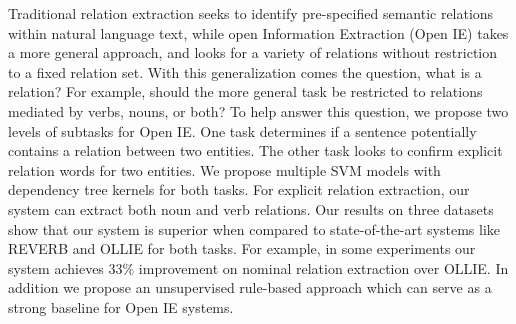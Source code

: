 Traditional relation extraction seeks to identify pre-specified semantic relations within natural language text, while open Information Extraction (Open
 IE) takes a more general approach, and looks for a variety of relations without
 restriction to a fixed relation set. With this generalization comes the
 question, what is a relation? For example, should the more general task be
 restricted to relations mediated by verbs, nouns, or both? To help answer this
 question, we propose two levels of subtasks for Open IE. One task determines if
 a sentence potentially contains a relation between two entities. The other task
 looks to confirm explicit relation words for two entities. We propose multiple
 SVM models with dependency tree kernels for both tasks. For explicit relation
 extraction, our system can extract both noun and verb relations. Our results on
 three datasets show that our system is superior when compared to
 state-of-the-art
 systems like REVERB and OLLIE for both tasks. For example, in some experiments
 our system achieves 33\% improvement on nominal relation extraction over OLLIE.
 In addition we propose an unsupervised rule-based approach which can serve as a
 strong baseline for Open IE systems.

